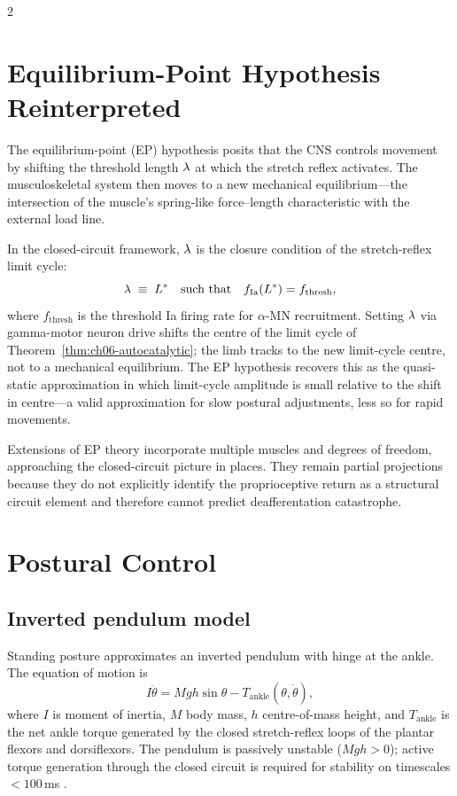 \begin{multicols}{2}

\section{Equilibrium-Point Hypothesis Reinterpreted}
\label{sec:ch06-ep}

The equilibrium-point (EP) hypothesis
\citep{feldman1966,feldman1986,bizzi1992} posits that the CNS controls
movement by shifting the threshold length $\lambda$ at which the stretch
reflex activates.  The musculoskeletal system then moves to a new mechanical
equilibrium---the intersection of the muscle's spring-like force--length
characteristic with the external load line.

In the closed-circuit framework, $\lambda$ is the closure condition of the
stretch-reflex limit cycle:
\begin{equation}
  \lambda \;\equiv\; L^* \quad\text{such that}\quad
  f_{\mathrm{Ia}}(L^*) = f_{\mathrm{thresh}},
  \label{eq:ch06-lambda}
\end{equation}
where $f_{\mathrm{thresh}}$ is the threshold Ia firing rate for $\alpha$-MN
recruitment.  Setting $\lambda$ via gamma-motor neuron drive shifts the
centre of the limit cycle of Theorem~\ref{thm:ch06-autocatalytic}; the limb
tracks to the new limit-cycle centre, not to a mechanical equilibrium.  The
EP hypothesis recovers this as the quasi-static approximation in which
limit-cycle amplitude is small relative to the shift in centre---a valid
approximation for slow postural adjustments, less so for rapid movements.

Extensions of EP theory \citep{latash2010,feldman2015} incorporate multiple
muscles and degrees of freedom, approaching the closed-circuit picture in
places.  They remain partial projections because they do not explicitly
identify the proprioceptive return as a structural circuit element and
therefore cannot predict deafferentation catastrophe.

\section{Postural Control}
\label{sec:ch06-posture}

\subsection{Inverted pendulum model}

Standing posture approximates an inverted pendulum with hinge at the ankle.
The equation of motion is
\begin{equation}
  I\ddot{\theta} = Mgh\sin\theta - T_{\mathrm{ankle}}(\theta, \dot{\theta}),
  \label{eq:ch06-pendulum}
\end{equation}
where $I$ is moment of inertia, $M$ body mass, $h$ centre-of-mass height,
and $T_{\mathrm{ankle}}$ is the net ankle torque generated by the closed
stretch-reflex loops of the plantar flexors and dorsiflexors.  The pendulum
is passively unstable ($Mgh > 0$); active torque generation through the
closed circuit is required for stability on timescales $< 100$\,ms
\citep{morasso2002,loram2002}.


\end{multicols}
